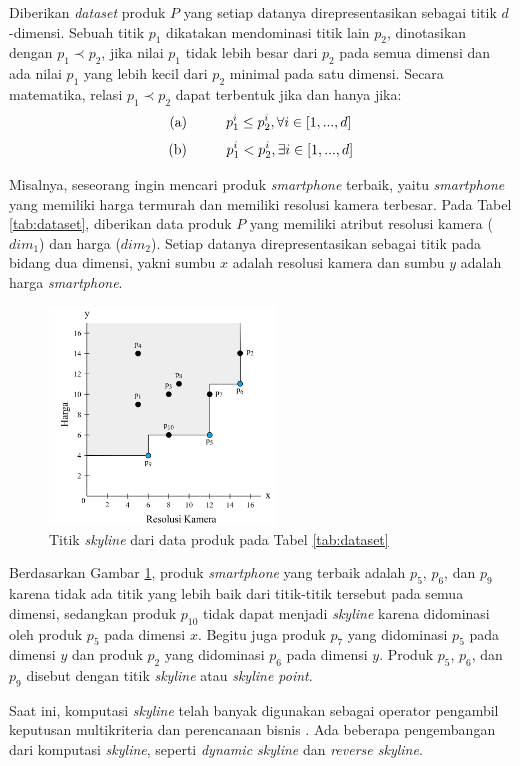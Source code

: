 Diberikan \textit{dataset} produk $P$ yang setiap datanya direpresentasikan sebagai titik $d$-dimensi. Sebuah titik $p_1$ dikatakan mendominasi titik lain $p_2$, dinotasikan dengan  $p_1 \prec p_2$, jika nilai $p_1$ tidak lebih besar dari $p_2$ pada semua dimensi dan ada nilai $p_1$ yang lebih kecil dari $p_2$ minimal pada satu dimensi. Secara matematika, relasi $p_1 \prec p_2$ dapat terbentuk jika dan hanya jika:
\[\text{(a)} \hspace*{1cm} p_1^i \leq p_2^i, \forall i \in [1, ..., d]\] 
\[\text{(b)} \hspace*{1cm} p_1^i < p_2^i, \exists i \in [1, ..., d]\]

Misalnya, seseorang ingin mencari produk \textit{smartphone} terbaik, yaitu \textit{smartphone} yang memiliki harga termurah dan memiliki resolusi kamera terbesar. Pada Tabel \ref{tab:dataset}, diberikan data produk $P$ yang memiliki atribut resolusi kamera ($dim_1$) dan harga ($dim_2$). Setiap datanya direpresentasikan sebagai titik pada bidang dua dimensi, yakni sumbu $x$ adalah resolusi kamera dan sumbu $y$ adalah harga \textit{smartphone}.

\begin{figure}[h]
	\centering
	\includegraphics[width=6cm]{assets/img/bab2/skyline.png}
	\caption{Titik \textit{skyline} dari data produk pada Tabel \ref{tab:dataset}}
	\label{fig:skyline}
\end{figure}

\pagebreak
Berdasarkan Gambar \ref{fig:skyline}, produk \textit{smartphone} yang terbaik adalah $p_5$, $p_6$, dan $p_9$ karena tidak ada titik yang lebih baik dari titik-titik tersebut pada semua dimensi, sedangkan produk $p_{10}$ tidak dapat menjadi \textit{skyline} karena didominasi oleh produk $p_5$ pada dimensi $x$. Begitu juga produk $p_7$ yang didominasi $p_5$ pada dimensi $y$ dan produk $p_2$ yang didominasi $p_6$ pada dimensi $y$. Produk $p_5$, $p_6$, dan $p_9$ disebut dengan titik \textit{skyline} atau \textit{skyline point}.

Saat ini, komputasi \textit{skyline} telah banyak digunakan sebagai operator pengambil keputusan multikriteria dan perencanaan bisnis \cite{dynamic-skyline-2}. Ada beberapa pengembangan dari komputasi \textit{skyline}, seperti \textit{dynamic skyline} dan \textit{reverse skyline}.  

